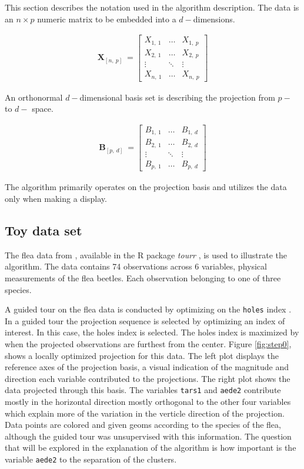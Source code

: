 \documentclass{monashthesis}
\begin{document}
This section describes the notation used in the algorithm description.
The data is an \(n \times p\) numeric matrix to be embedded into a
\(d-\)dimensions.

\begin{align*}
  \textbf{X}_{[n,~p]} ~=
  \begin{bmatrix}
    X_{1,~1} & \dots  & X_{1,~p} \\
    X_{2,~1} & \dots  & X_{2,~p} \\
    \vdots   & \ddots & \vdots   \\
    X_{n,~1} & \dots  & X_{n,~p}
  \end{bmatrix}
\end{align*}

An orthonormal \(d-\)dimensional basis set is describing the projection
from \(p-\) to \(d-\) space.

\begin{align*}
  \textbf{B}_{[p,~d]} ~=
  \begin{bmatrix}
    B_{1,~1} & \dots  & B_{1,~d} \\
    B_{2,~1} & \dots  & B_{2,~d} \\
    \vdots   & \ddots & \vdots   \\
    B_{p,~1} & \dots  & B_{p,~d}
  \end{bmatrix}
\end{align*}

The algorithm primarily operates on the projection basis and utilizes
the data only when making a display.

\subsection{Toy data set}\label{toy-data-set}

The flea data from \textcite{lubischew_use_1962}, available in the R
package \emph{tourr} \autocite{wickham_tourr_2011}, is used to
illustrate the algorithm. The data contains 74 observations across 6
variables, physical measurements of the flea beetles. Each observation
belonging to one of three species.

A guided tour on the flea data is conducted by optimizing on the
\texttt{holes} index \autocite{cook_interactive_2007}. In a guided tour
the projection sequence is selected by optimizing an index of interest.
In this case, the holes index is selected. The holes index is maximized
by when the projected observations are furthest from the center. Figure
\ref{fig:step0}, shows a locally optimized projection for this data. The
left plot displays the reference axes of the projection basis, a visual
indication of the magnitude and direction each variable contributed to
the projections. The right plot shows the data projected through this
basis. The variables \texttt{tars1} and \texttt{aede2} contribute mostly
in the horizontal direction mostly orthogonal to the other four
variables which explain more of the variation in the verticle direction
of the projection. Data points are colored and given geoms according to
the species of the flea, although the guided tour was unsupervised with
this information. The question that will be explored in the explanation
of the algorithm is how important is the variable \texttt{aede2} to the
separation of the clusters.
\end{document}
